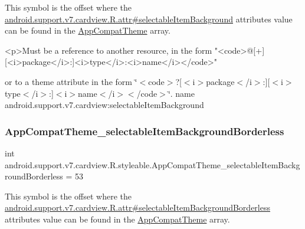 This symbol is the offset where the \hyperlink{classandroid_1_1support_1_1v7_1_1cardview_1_1R_1_1attr_ac1c9dfc901b203e19b077f8cb3add743}{android.\+support.\+v7.\+cardview.\+R.\+attr\#selectable\+Item\+Background} attribute\textquotesingle{}s value can be found in the \hyperlink{classandroid_1_1support_1_1v7_1_1cardview_1_1R_1_1styleable_a52e6f69f954ecc2622d72c0b4d298938}{App\+Compat\+Theme} array.

\begin{DoxyVerb}      <p>Must be a reference to another resource, in the form "<code>@[+][<i>package</i>:]<i>type</i>:<i>name</i></code>"
\end{DoxyVerb}
 or to a theme attribute in the form \char`\"{}$<$code$>$?\mbox{[}$<$i$>$package$<$/i$>$\+:\mbox{]}\mbox{[}$<$i$>$type$<$/i$>$\+:\mbox{]}$<$i$>$name$<$/i$>$$<$/code$>$\char`\"{}.  name android.\+support.\+v7.\+cardview\+:selectable\+Item\+Background \mbox{\label{classandroid_1_1support_1_1v7_1_1cardview_1_1R_1_1styleable_a2515e8712f0532b1b2f41d046b23ac29}} 
\subsubsection{\texorpdfstring{App\+Compat\+Theme\+\_\+selectable\+Item\+Background\+Borderless}{AppCompatTheme\_selectableItemBackgroundBorderless}}
{\footnotesize\ttfamily int android.\+support.\+v7.\+cardview.\+R.\+styleable.\+App\+Compat\+Theme\+\_\+selectable\+Item\+Background\+Borderless = 53\hspace{0.3cm}{\ttfamily [static]}}

This symbol is the offset where the \hyperlink{classandroid_1_1support_1_1v7_1_1cardview_1_1R_1_1attr_abb688460f8a982ff21259f7207979ee1}{android.\+support.\+v7.\+cardview.\+R.\+attr\#selectable\+Item\+Background\+Borderless} attribute\textquotesingle{}s value can be found in the \hyperlink{classandroid_1_1support_1_1v7_1_1cardview_1_1R_1_1styleable_a52e6f69f954ecc2622d72c0b4d298938}{App\+Compat\+Theme} array.


